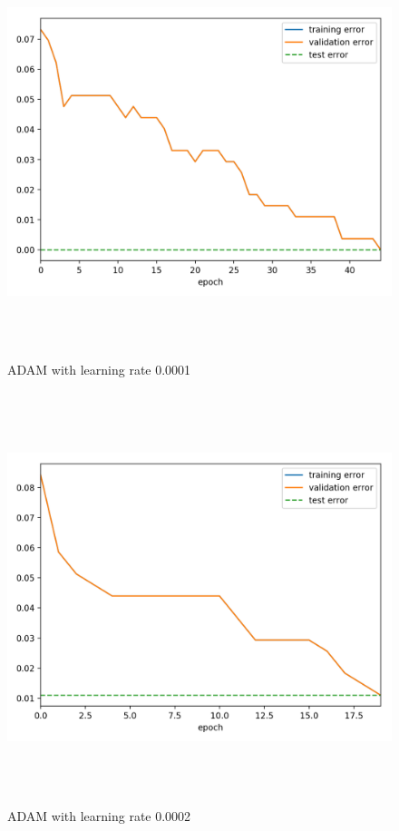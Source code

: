 \documentclass[a4paper]{article}
\begin{document}
\begin{figure}[h]
\caption{ADAM with learning rate 0.0001}
\centering
\includegraphics[width=15cm, height=12cm]{AD_LR0001}
\end{figure}

\begin{figure}[h]
\caption{ADAM with learning rate 0.0002}
\centering
\includegraphics[width=15cm, height=12cm]{AD_LR0002}
\end{figure}
\end{document}
